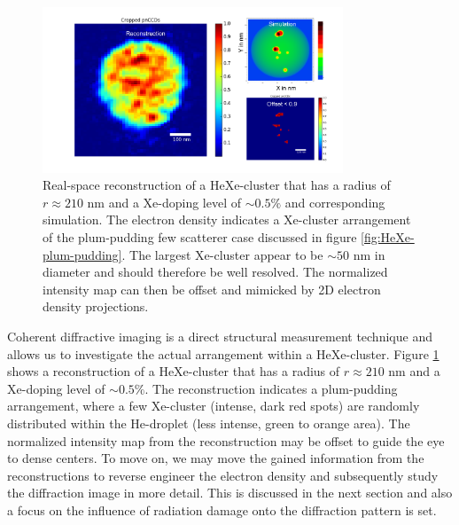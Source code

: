 \begin{figure}
 	\centering
 		\includegraphics[width=0.80\textwidth]{images/results/reconstructions-to-simulations.png}
 	\caption{Real-space reconstruction of a HeXe-cluster that has a radius of $r\approx 210$ nm and a Xe-doping level of $\sim 0.5\%$ and corresponding simulation. The electron density indicates a Xe-cluster arrangement of the plum-pudding few scatterer case discussed in figure \ref{fig:HeXe-plum-pudding}. The largest Xe-cluster appear to be $\sim 50$ nm in diameter and should therefore be well resolved. The normalized intensity map can then be offset and mimicked by 2D electron density projections.}
 	\label{fig:HeXe-cluster-60}
\end{figure}
Coherent diffractive imaging is a direct structural measurement technique and allows us to investigate the actual arrangement within a HeXe-cluster. Figure \ref{fig:HeXe-cluster-60} shows a reconstruction of a HeXe-cluster that has a radius of $r\approx 210$ nm and a Xe-doping level of $\sim 0.5 \%$. The reconstruction indicates a plum-pudding arrangement, where a few Xe-cluster (intense, dark red spots) are randomly distributed within the He-droplet (less intense, green to orange area). The normalized intensity map from the reconstruction may be offset to guide the eye to dense centers. To move on, we may move the gained information from the reconstructions to reverse engineer the electron density and subsequently study the diffraction image in more detail. This is discussed in the next section and also a focus on the influence of radiation damage onto the diffraction pattern is set.
%
%
%
%
%
%
